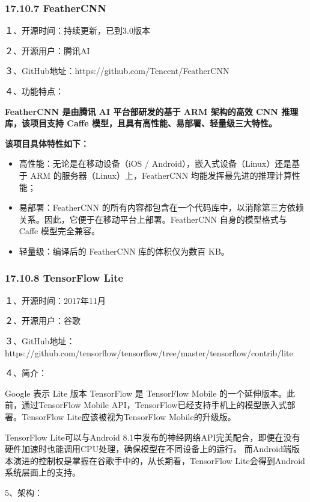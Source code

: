 \subsubsection{17.10.7 FeatherCNN}\label{feathercnn}

１、开源时间：持续更新，已到3.0版本　　　

２、开源用户：腾讯AI　　　　

３、GitHub地址：https://github.com/Tencent/FeatherCNN

４、功能特点：

\textbf{FeatherCNN 是由腾讯 AI 平台部研发的基于 ARM 架构的高效 CNN
推理库，该项目支持 Caffe 模型，且具有高性能、易部署、轻量级三大特性。}

\textbf{该项目具体特性如下：}

\begin{itemize}
\item
  高性能：无论是在移动设备（iOS / Android），嵌入式设备（Linux）还是基于
  ARM 的服务器（Linux）上，FeatherCNN 均能发挥最先进的推理计算性能；
\item
  易部署：FeatherCNN
  的所有内容都包含在一个代码库中，以消除第三方依赖关系。因此，它便于在移动平台上部署。FeatherCNN
  自身的模型格式与 Caffe 模型完全兼容。
\item
  轻量级：编译后的 FeatherCNN 库的体积仅为数百 KB。
\end{itemize}

\subsubsection{17.10.8 TensorFlow Lite}\label{tensorflow-lite}

１、开源时间：2017年11月　　　

２、开源用户：谷歌　　　

３、GitHub地址：https://github.com/tensorflow/tensorflow/tree/master/tensorflow/contrib/lite

４、简介：

Google 表示 Lite 版本 TensorFlow 是 TensorFlow Mobile
的一个延伸版本。此前，通过TensorFlow Mobile
API，TensorFlow已经支持手机上的模型嵌入式部署。TensorFlow
Lite应该被视为TensorFlow Mobile的升级版。

TensorFlow Lite可以与Android
8.1中发布的神经网络API完美配合，即便在没有硬件加速时也能调用CPU处理，确保模型在不同设备上的运行。
而Android端版本演进的控制权是掌握在谷歌手中的，从长期看，TensorFlow
Lite会得到Android系统层面上的支持。

5、架构：

